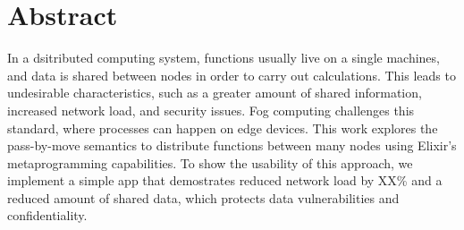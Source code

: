 
\chapter{Abstract}

In a dsitributed computing system, functions usually live on a 
single machines, and data is shared between nodes in order to 
carry out calculations. This leads to undesirable characteristics,
such as a greater amount of shared information, increased network load,
and security issues. Fog computing challenges this standard, 
where processes can happen on edge devices. This work explores the 
pass-by-move semantics to distribute functions between many nodes
using Elixir's metaprogramming capabilities. To show the usability
of this approach, we implement a simple app that demostrates reduced
network load by XX\% and a reduced amount of shared data, which protects
data vulnerabilities and confidentiality.


\endinput

